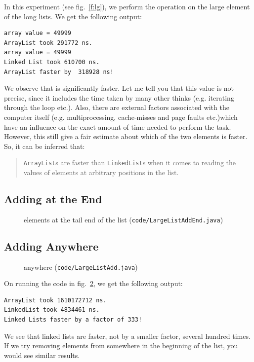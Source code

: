 \documentclass[12pt,a4paper]{article}
\begin{document}
In this experiment (see fig.~\ref{f:lg}), we perform the \lstinline@get@ operation on the large element of the long lists.
We get the following output:
\begin{lstlisting}
array value = 49999
ArrayList took 291772 ns.
array value = 49999
Linked List took 610700 ns.
ArrayList faster by  318928 ns!
\end{lstlisting}

We observe that \lstinline@ArrayList@ is significantly faster. Let me tell you that this value is not precise, since it includes the time taken by many other thinks (e.g. iterating through the loop etc.). Also, there are external factors associated with the computer itself (e.g. multiprocessing, cache-misses and page faults etc.)which have an influence on the exact amount of time needed to perform the task. However, this still give a fair estimate about which of the two elements is faster. So, it can be inferred that:

\begin{quote}
	\lstinline|ArrayList|s are faster than \lstinline|LinkedList|s when it comes to reading the values of elements at arbitrary positions in the list.
\end{quote}

\subsection{Adding at the End}
\begin{figure}
	
	\caption{\lstinline@add@ing elements at the tail end of the list (\texttt{code/LargeListAddEnd.java})}
	\label{f:lae}
\end{figure}


\subsection{Adding Anywhere}
\begin{figure}
	
	\caption{\lstinline@add@ing anywhere (\texttt{code/LargeListAdd.java})}
	\label{f:la}
\end{figure}

On running the code in fig.~\ref{f:la}, we get the following output:
\begin{lstlisting}
ArrayList took 1610172712 ns.
LinkedList took 4834461 ns.
Linked Lists faster by a factor of 333!
\end{lstlisting}

We see that linked lists are faster, not by a smaller factor, several hundred times. If we try removing elements from somewhere in the beginning of the list, you would see similar results.
\end{document}
